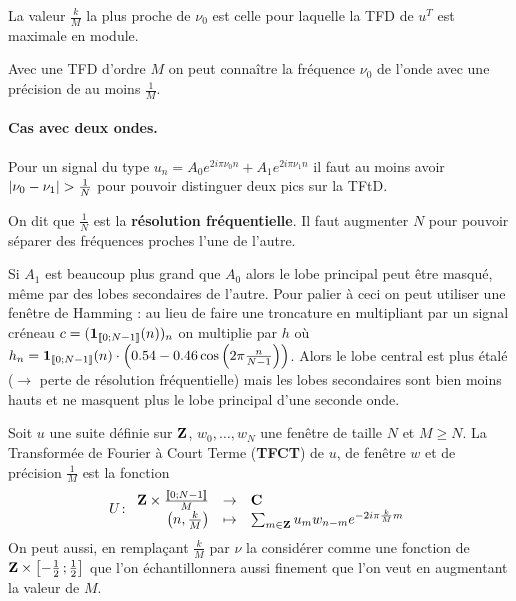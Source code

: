 \begin{thm}
	La valeur $\frac{k}{M}$ la plus proche de $\nu_0$ est celle pour laquelle la TFD de $u^T$ est maximale en module.
\end{thm}

\begin{pop}
	Avec une TFD d'ordre $M$ on peut connaître la fréquence $\nu_0$ de l'onde avec une précision de au moins $\frac{1}{M}$.
\end{pop}

\paragraph{Cas avec deux ondes.}
Pour un signal du type $u_n = A_0 e^{2i\pi \nu_0 n} + A_1 e^{2i\pi \nu_1 n}$ il faut au moins avoir $\left\lvert\nu_0 - \nu_1\right\rvert > \frac{1}{N}$ pour pouvoir distinguer deux pics sur la TFtD.

\begin{voc}
	On dit que $\frac{1}{N}$ est la \textbf{résolution fréquentielle}.
	Il faut augmenter $N$ pour pouvoir séparer des fréquences proches l'une de l'autre.
\end{voc}

Si $A_1$ est beaucoup plus grand que $A_0$ alors le lobe principal peut être masqué, même par des lobes secondaires de l'autre.
Pour palier à ceci on peut utiliser une fenêtre de Hamming : au lieu de faire une troncature en multipliant par un signal créneau $c = (\operatorname{\mathbf{1}}_{\mathopen{}\mathclose{\left[\![0\mathclose{}\mathpunct{};N - 1\right]\!]}}(n))_n$ on multiplie par $h$ où $h_n = \operatorname{\mathbf{1}}_{\mathopen{}\mathclose{\left[\![0\mathclose{}\mathpunct{};N - 1\right]\!]}}(n) \cdot \left( 0.54 - 0.46 \cos \left( 2\pi \frac{n}{N - 1} \right) \right)$.
Alors le lobe central est plus étalé ($\rightarrow$ perte de résolution fréquentielle) mais les lobes secondaires sont bien moins hauts et ne masquent plus le lobe principal d'une seconde onde.

\begin{defn}
	Soit $u$ une suite définie sur $\mathbf{Z}$, $w_0,\ldots,w_N$ une fenêtre de taille $N$ et $M \geq N$.
	La Transformée de Fourier à Court Terme (\textbf{TFCT}) de $u$, de fenêtre $w$ et de précision $\frac{1}{M}$ est la fonction
	$$U \colon \begin{array}{rcl}
		\mathbf{Z} \times \frac{\mathopen{}\mathclose{\left[\![0\mathclose{}\mathpunct{};N - 1\right]\!]}}{M} & \to & \mathbf{C} \\
		\left( n, \frac{k}{M} \right) & \mapsto & \sum_{m \in \mathbf{Z}} u_m w_{n - m} e^{-2i\pi \frac{k}{M} m}
	\end{array}$$
	On peut aussi, en remplaçant $\frac{k}{M}$ par $\nu$ la considérer comme une fonction de $\mathbf{Z} \times \mathopen{}\mathclose{\left[-\frac{1}{2}\mathclose{}\mathpunct{};\frac{1}{2}\right]}$ que l'on échantillonnera aussi finement que l'on veut en augmentant la valeur de $M$.
\end{defn}

